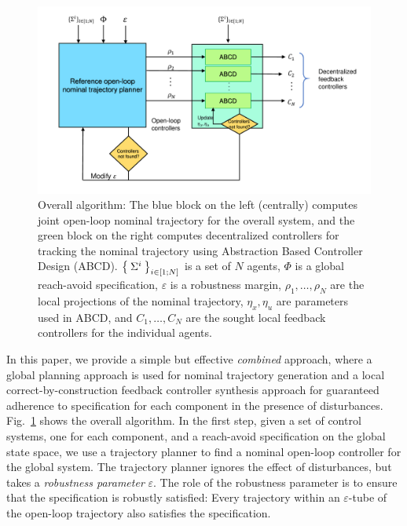 \begin{figure}[t]
\includegraphics[scale=0.28]{figures/Algorithm_outline_updated.pdf}
\caption{Overall algorithm: The blue block on the left (centrally) computes joint open-loop nominal trajectory for the overall system, and the green block on the right computes decentralized controllers for tracking the nominal trajectory using Abstraction Based Controller Design (ABCD).
$\Set{\Sigma^i}_{i\in [1;N]}$ is a set of $N$ agents, $\Phi$ is a global reach-avoid specification, $\varepsilon$ is a robustness margin, $\rho_1,\ldots,\rho_N$ are the local projections of the nominal trajectory, $\eta_x,\eta_u$ are parameters used in ABCD, and $C_1,\ldots,C_N$ are the sought local feedback controllers for the individual agents.
}
\label{fig:overall}
\end{figure}

In this paper, we provide a simple but effective \emph{combined} approach, where a global planning approach is used for nominal trajectory generation and 
a local correct-by-construction feedback controller synthesis approach for guaranteed adherence to specification for each component
in the presence of disturbances.
Fig.~\ref{fig:overall} shows the overall algorithm.
In the first step, 
given a set of control systems, one for each component, and a reach-avoid specification on the global state space, we use a trajectory planner to
find a nominal open-loop controller for the global system.
The trajectory planner ignores the effect of disturbances, but takes a \emph{robustness parameter} $\varepsilon$.
The role of the robustness parameter is to ensure that the specification is robustly satisfied: 
Every trajectory within an $\varepsilon$-tube of the open-loop trajectory also satisfies the specification.

